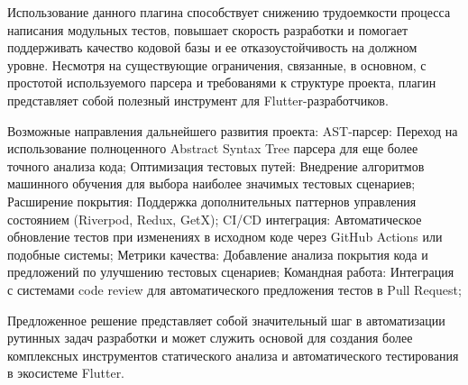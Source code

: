 \documentclass[14pt, russian]{scrartcl}
\begin{document}
Использование данного плагина способствует снижению трудоемкости процесса написания модульных тестов, повышает скорость разработки и помогает поддерживать качество кодовой базы и ее отказоустойчивость на должном уровне. Несмотря на существующие ограничения, связанные, в основном, с простотой используемого парсера и требованями к структуре проекта, плагин представляет собой полезный инструмент для Flutter-разработчиков.

Возможные направления дальнейшего развития проекта:
AST-парсер: Переход на использование полноценного Abstract Syntax Tree парсера для еще более точного анализа кода;
Оптимизация тестовых путей: Внедрение алгоритмов машинного обучения для выбора наиболее значимых тестовых сценариев;
Расширение покрытия: Поддержка дополнительных паттернов управления состоянием (Riverpod, Redux, GetX);
CI/CD интеграция: Автоматическое обновление тестов при изменениях в исходном коде через GitHub Actions или подобные системы;
Метрики качества: Добавление анализа покрытия кода и предложений по улучшению тестовых сценариев;
Командная работа: Интеграция с системами code review для автоматического предложения тестов в Pull Request;

Предложенное решение представляет собой значительный шаг в автоматизации рутинных задач разработки и может служить основой для создания более комплексных инструментов статического анализа и автоматического тестирования в экосистеме Flutter.
\end{document}
